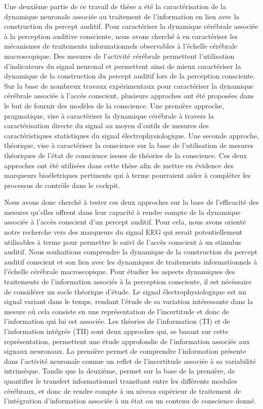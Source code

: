 Une deuxième partie de ce travail de thèse a été la caractérisation de la dynamique neuronale associée au traitement de l'information en lien avec la construction du percept auditif. 
Pour caractériser la dynamique cérébrale associée à la perception auditive consciente, nous avons cherché à en caractériser les mécanismes de traitements informationnels observables à l'échelle cérébrale macroscopique. 
Des mesures de l'activité cérébrale permettent l'utilisation d'indicateurs du signal neuronal et permettent ainsi de mieux caractériser la dynamique de la construction du percept auditif lors de la perception consciente. 
Sur la base de nombreux travaux expérimentaux pour caractériser la dynamique cérébrale associée à l'accès conscient, plusieurs approches ont été proposées dans le but de fournir des modèles de la conscience. 
Une première approche, pragmatique, vise à caractériser la dynamique cérébrale à travers la caractérisation directe du signal au moyen d'outils de mesures des caractéristiques statistiques du signal électrophysiologique. 
Une seconde approche, théorique, vise à caractériser la conscience sur la base de l'utilisation de mesures théoriques de l'état de conscience issues de théories de la conscience. 
Ces deux approches ont été utilisées dans cette thèse afin de mettre en évidence des marqueurs bioéletriques pertinents qui à terme pourraient aider à compléter les processus de contrôle dans le cockpit.

Nous avons donc cherché à tester ces deux approches sur la base de l'efficacité des mesures qu'elles offrent dans leur capacité à rendre compte de la dynamique associée à l'accès conscient d'un percept auditif. 
Pour cela, nous avons orienté notre recherche vers des marqueurs du signal EEG qui serait potentiellement utilisables à terme pour permettre le suivi de l'accès conscient à un stimulus auditif. 
Nous souhaitions comprendre la dynamique de la construction du percept auditif conscient et son lien avec les dynamiques de traitements informationnels à l'échelle cérébrale macroscopique. 
Pour étudier les aspects dynamiques des traitements de l'information associés à la perception consciente, il est nécéssaire de considérer un socle théorique d'étude. 
Le signal électrophysiologique est un signal variant dans le temps, rendant l'étude de sa variation intéressante dans la mesure où cela consiste en une représentation de l'incertitude et donc de l'information qui lui est associée. 
Les théories de l'information (TI) et de l'information intégrée (TII) sont deux approches qui, se basant sur cette représentation, permettent une étude approfondie de l'information associée aux signaux neuronaux. 
La première permet de comprendre l'information présente dans l'activité neuronale comme un reflet de l'incertitude associée à sa variabilité intrinsèque. 
Tandis que la deuxième, permet sur la base de la première, de quantifier le transfert informationnel transitant entre les différents modules cérébraux, et donc de rendre compte à un niveau supérieur de traitement de l'intégration d'information associée à un état ou un contenu de conscience donné. 

